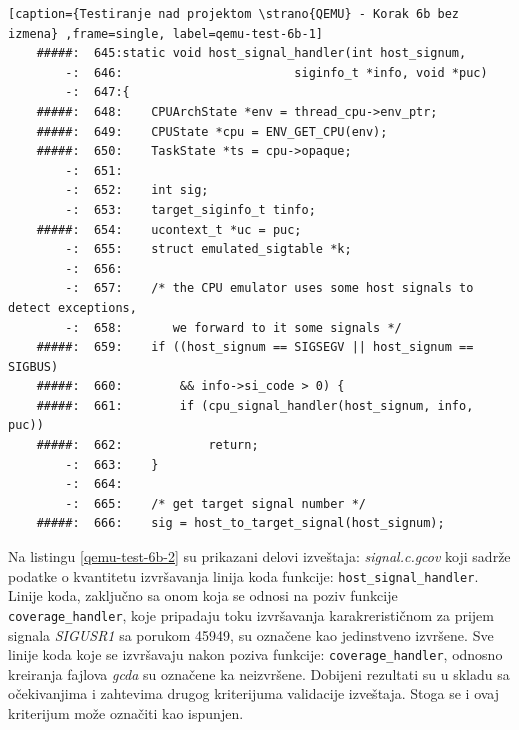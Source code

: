 \documentclass[12pt,oneside]{memoir}
\newcommand{\kod}[1]{\texttt{#1}}
\newcommand{\strano}[1]{\textit{#1}}
\begin{document}
\begin{lstlisting}[caption={Testiranje nad projektom \strano{QEMU} - Korak 6b bez izmena} ,frame=single, label=qemu-test-6b-1]
    #####:  645:static void host_signal_handler(int host_signum,
        -:  646:                        siginfo_t *info, void *puc)
        -:  647:{
    #####:  648:    CPUArchState *env = thread_cpu->env_ptr;
    #####:  649:    CPUState *cpu = ENV_GET_CPU(env);
    #####:  650:    TaskState *ts = cpu->opaque;
        -:  651:
        -:  652:    int sig;
        -:  653:    target_siginfo_t tinfo;
    #####:  654:    ucontext_t *uc = puc;
        -:  655:    struct emulated_sigtable *k;
        -:  656:
        -:  657:    /* the CPU emulator uses some host signals to detect exceptions,
        -:  658:       we forward to it some signals */
    #####:  659:    if ((host_signum == SIGSEGV || host_signum == SIGBUS)
    #####:  660:        && info->si_code > 0) {
    #####:  661:        if (cpu_signal_handler(host_signum, info, puc))
    #####:  662:            return;
        -:  663:    }
        -:  664:
        -:  665:    /* get target signal number */
    #####:  666:    sig = host_to_target_signal(host_signum);
\end{lstlisting}

Na listingu \ref{qemu-test-6b-2} su prikazani delovi izveštaja:
\strano{signal.c.gcov} koji sadrže podatke o kvantitetu izvršavanja linija koda funkcije: \kod{host\_signal\_handler}. Linije koda, zaključno sa onom koja se odnosi na poziv funkcije \kod{coverage\_handler}, koje pripadaju toku izvršavanja karakrerističnom za prijem signala \strano{SIGUSR1} sa porukom  45949, su označene kao jedinstveno izvršene. Sve linije koda koje se izvršavaju nakon poziva funkcije: \kod{coverage\_handler}, odnosno kreiranja fajlova \strano{gcda} su označene ka neizvršene. Dobijeni rezultati su u skladu sa očekivanjima i zahtevima drugog kriterijuma validacije izveštaja. Stoga se i ovaj kriterijum može označiti kao ispunjen. 

\newpage
\end{document}
